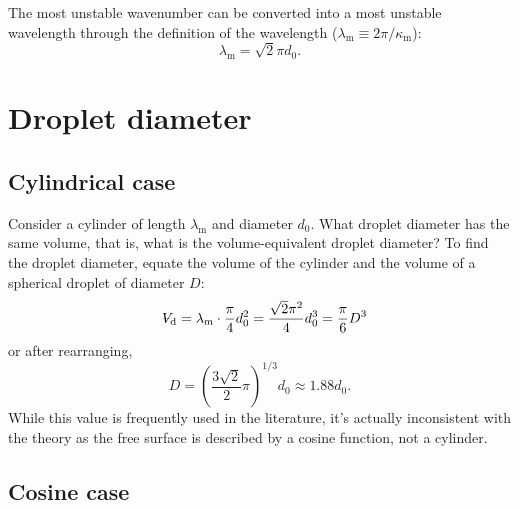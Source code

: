 The most unstable wavenumber can be converted into a most unstable wavelength through the definition of the wavelength ($\lambda_\text{m} \equiv 2 \pi / \kappa_\text{m}$):
\begin{equation}
   \lambda_\text{m} = \sqrt{2} \pi d_0. \label{eqn:most unstable wavelength}
\end{equation}

\section{Droplet diameter}

\subsection{Cylindrical case}

Consider a cylinder of length $\lambda_\text{m}$ and diameter $d_0$. What droplet diameter has the same volume, that is, what is the volume-equivalent droplet diameter? To find the droplet diameter, equate the volume of the cylinder and the volume of a spherical droplet of diameter $D$:
\begin{equation}
   \Vol_\text{d} = \lambda_\text{m} \cdot \frac{\pi}{4} d_0^2 = \frac{\sqrt{2} \pi^2}{4} d_0^3 = \frac{\pi}{6} D^3
\end{equation}
or after rearranging,
\begin{equation}
   D = \left(\frac{3 \sqrt{2}}{2} \pi\right)^{1/3} d_0 \approx 1.88 d_0.
\end{equation}
While this value is frequently used in the literature, it's actually inconsistent with the theory as the free surface is described by a cosine function, not a cylinder.

\subsection{Cosine case}

